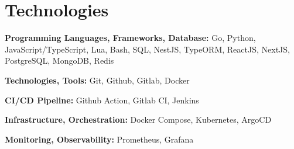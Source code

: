 \section{Technologies}

\begin{onecolentry}
	\textbf{Programming Languages, Frameworks, Database:}
	Go,
	Python,
	JavaScript/TypeScript,
	Lua,
	Bash,
	SQL,
	NestJS,
	TypeORM,
	ReactJS,
	NextJS,
	PostgreSQL,
	MongoDB,
	Redis
\end{onecolentry}

\vspace{0.2 cm}

\begin{onecolentry}
	\textbf{Technologies, Tools:}
	Git,
	Github,
	Gitlab,
	Docker
\end{onecolentry}

\vspace{0.2 cm}

\begin{onecolentry}
	\textbf{CI/CD Pipeline:}
	Github Action,
	Gitlab CI,
	Jenkins
\end{onecolentry}

\vspace{0.2 cm}

\begin{onecolentry}
	\textbf{Infrastructure, Orchestration:}
	Docker Compose,
	Kubernetes,
	ArgoCD
\end{onecolentry}

\vspace{0.2 cm}

\begin{onecolentry}
	\textbf{Monitoring, Observability:}
	Prometheus,
	Grafana
\end{onecolentry}

%
%
%

\vspace{0.2 cm}

